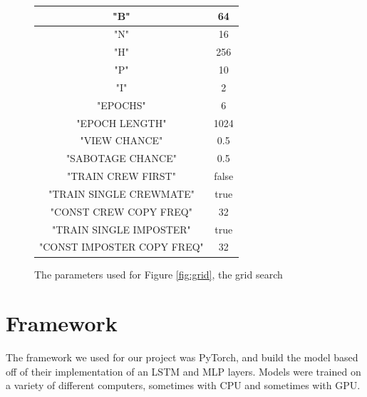 \documentclass[10pt,twocolumn,letterpaper]{article}
\begin{document}
\begin{figure}
   \centering
\begin{tabular}{ |c|c| } 
\hline 
"B" & 64 \\
\hline
"N" & 16 \\
\hline
"H"& 256 \\
\hline
"P"& 10 \\
\hline
"I"& 2 \\
\hline
"EPOCHS"& 6 \\
\hline
"EPOCH LENGTH"& 1024 \\
\hline
"VIEW CHANCE"& 0.5 \\
\hline
"SABOTAGE CHANCE"& 0.5 \\
\hline
"TRAIN CREW FIRST"& false \\
\hline
"TRAIN SINGLE CREWMATE"& true \\
\hline
"CONST CREW COPY FREQ"& 32 \\
\hline
"TRAIN SINGLE IMPOSTER"& true \\
\hline
"CONST IMPOSTER COPY FREQ"& 32 \\
\hline
\end{tabular}
\caption{The parameters used for Figure \ref{fig:grid}, the grid search}
\label{tab:params}
\end{figure}

\section{Framework}
The framework we used for our project
was PyTorch, and build the model based off of their implementation
of an LSTM and MLP layers. Models were trained on a variety of different
computers, sometimes with CPU and sometimes with GPU.
\end{document}
